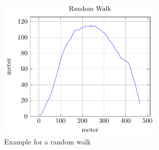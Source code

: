 \documentclass[master,english]{hgbthesis}
\begin{document}
\begin{figure}
	\centering
	\includegraphics[width=0.7\textwidth]{./images/randomwalk}
	\caption{Example for a random walk}
	\label{fig:randomwalk}
\end{figure}
\end{document}
